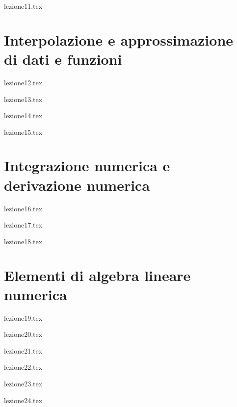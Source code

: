 \documentclass[12pt,a4paper,headings=optiontohead]{scrbook}
\begin{document}
{lezione11.tex}
\newpage

\chapter{Interpolazione e approssimazione di dati e funzioni}

{lezione12.tex}
\newpage

{lezione13.tex}
\newpage

{lezione14.tex}
\newpage

{lezione15.tex}
\newpage

\chapter{Integrazione numerica e derivazione numerica}

{lezione16.tex}
\newpage

{lezione17.tex}
\newpage

{lezione18.tex}
\newpage

\chapter{Elementi di algebra lineare numerica}

{lezione19.tex}
\newpage

{lezione20.tex}
\newpage

{lezione21.tex}
\newpage

{lezione22.tex}
\newpage

{lezione23.tex}
\newpage

{lezione24.tex}
\newpage
\end{document}
